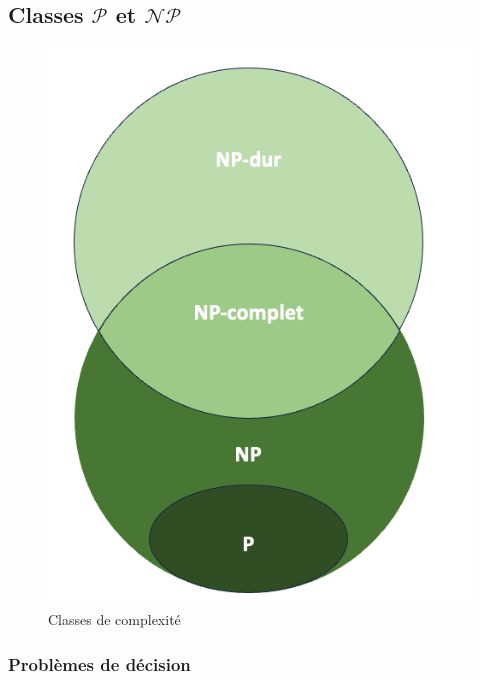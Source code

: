 \subsection{Classes $\mathcal{P}$ et $\mathcal{NP}$}
\begin{figure}[H]
    \centering
    \includegraphics[scale=0.3]{pictures/complexity_class.png}
    \caption{Classes de complexité}
\end{figure}

\subsubsection{Problèmes de décision}
\label{sub:problemes_de_decision}

